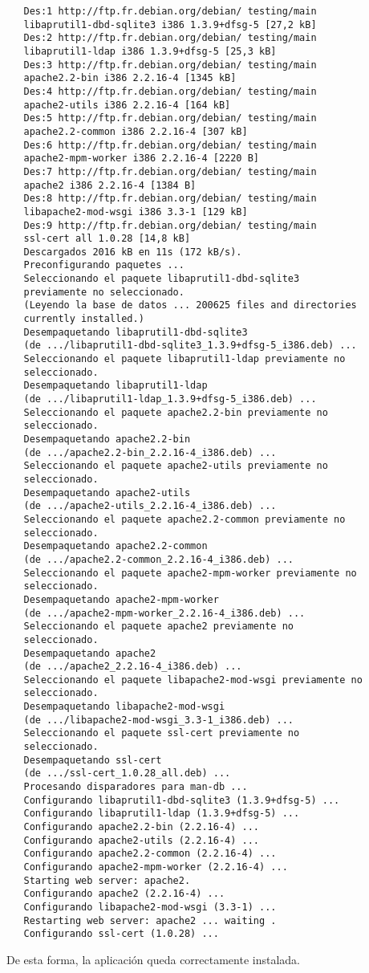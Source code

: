    \begin{verbatim}
   Des:1 http://ftp.fr.debian.org/debian/ testing/main
   libaprutil1-dbd-sqlite3 i386 1.3.9+dfsg-5 [27,2 kB]
   Des:2 http://ftp.fr.debian.org/debian/ testing/main
   libaprutil1-ldap i386 1.3.9+dfsg-5 [25,3 kB]
   Des:3 http://ftp.fr.debian.org/debian/ testing/main
   apache2.2-bin i386 2.2.16-4 [1345 kB]
   Des:4 http://ftp.fr.debian.org/debian/ testing/main
   apache2-utils i386 2.2.16-4 [164 kB]
   Des:5 http://ftp.fr.debian.org/debian/ testing/main
   apache2.2-common i386 2.2.16-4 [307 kB]
   Des:6 http://ftp.fr.debian.org/debian/ testing/main
   apache2-mpm-worker i386 2.2.16-4 [2220 B]
   Des:7 http://ftp.fr.debian.org/debian/ testing/main
   apache2 i386 2.2.16-4 [1384 B]
   Des:8 http://ftp.fr.debian.org/debian/ testing/main
   libapache2-mod-wsgi i386 3.3-1 [129 kB]
   Des:9 http://ftp.fr.debian.org/debian/ testing/main
   ssl-cert all 1.0.28 [14,8 kB]
   Descargados 2016 kB en 11s (172 kB/s).
   Preconfigurando paquetes ...
   Seleccionando el paquete libaprutil1-dbd-sqlite3
   previamente no seleccionado.
   (Leyendo la base de datos ... 200625 files and directories
   currently installed.)
   Desempaquetando libaprutil1-dbd-sqlite3
   (de .../libaprutil1-dbd-sqlite3_1.3.9+dfsg-5_i386.deb) ...
   Seleccionando el paquete libaprutil1-ldap previamente no
   seleccionado.
   Desempaquetando libaprutil1-ldap
   (de .../libaprutil1-ldap_1.3.9+dfsg-5_i386.deb) ...
   Seleccionando el paquete apache2.2-bin previamente no
   seleccionado.
   Desempaquetando apache2.2-bin
   (de .../apache2.2-bin_2.2.16-4_i386.deb) ...
   Seleccionando el paquete apache2-utils previamente no
   seleccionado.
   Desempaquetando apache2-utils
   (de .../apache2-utils_2.2.16-4_i386.deb) ...
   Seleccionando el paquete apache2.2-common previamente no
   seleccionado.
   Desempaquetando apache2.2-common
   (de .../apache2.2-common_2.2.16-4_i386.deb) ...
   Seleccionando el paquete apache2-mpm-worker previamente no
   seleccionado.
   Desempaquetando apache2-mpm-worker
   (de .../apache2-mpm-worker_2.2.16-4_i386.deb) ...
   Seleccionando el paquete apache2 previamente no
   seleccionado.
   Desempaquetando apache2
   (de .../apache2_2.2.16-4_i386.deb) ...
   Seleccionando el paquete libapache2-mod-wsgi previamente no
   seleccionado.
   Desempaquetando libapache2-mod-wsgi
   (de .../libapache2-mod-wsgi_3.3-1_i386.deb) ...
   Seleccionando el paquete ssl-cert previamente no
   seleccionado.
   Desempaquetando ssl-cert
   (de .../ssl-cert_1.0.28_all.deb) ...
   Procesando disparadores para man-db ...
   Configurando libaprutil1-dbd-sqlite3 (1.3.9+dfsg-5) ...
   Configurando libaprutil1-ldap (1.3.9+dfsg-5) ...
   Configurando apache2.2-bin (2.2.16-4) ...
   Configurando apache2-utils (2.2.16-4) ...
   Configurando apache2.2-common (2.2.16-4) ...
   Configurando apache2-mpm-worker (2.2.16-4) ...
   Starting web server: apache2.
   Configurando apache2 (2.2.16-4) ...
   Configurando libapache2-mod-wsgi (3.3-1) ...
   Restarting web server: apache2 ... waiting .
   Configurando ssl-cert (1.0.28) ...
   \end{verbatim}

   De esta forma, la aplicación queda correctamente instalada.